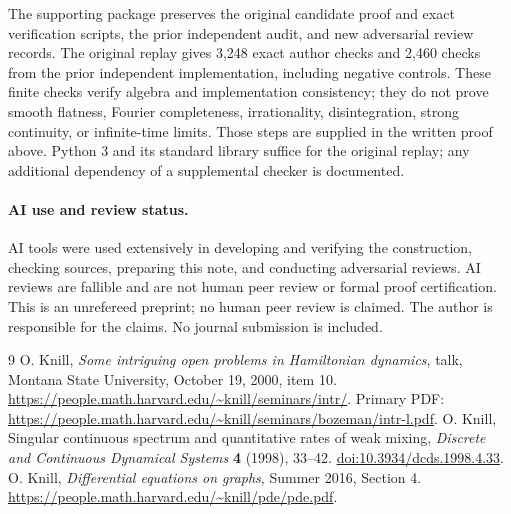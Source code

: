 \documentclass[11pt]{article}
\begin{document}
The supporting package preserves the original candidate proof and exact
verification scripts, the prior independent audit, and new adversarial review
records. The original replay gives 3,248 exact author checks and 2,460 checks
from the prior independent implementation, including negative controls.
These finite checks verify algebra and implementation consistency; they do
not prove smooth flatness, Fourier completeness, irrationality, disintegration,
strong continuity, or infinite-time limits. Those steps are supplied in the
written proof above. Python 3 and its standard library suffice for the original
replay; any additional dependency of a supplemental checker is documented.

\paragraph{AI use and review status.}
AI tools were used extensively in developing and verifying the construction,
checking sources, preparing this note, and conducting adversarial reviews.
AI reviews are fallible and are not human peer review or formal proof
certification. This is an unrefereed preprint; no human peer review is claimed.
The author is responsible for the claims. No journal submission is included.

\begin{thebibliography}{9}
 O. Knill,
\emph{Some intriguing open problems in Hamiltonian dynamics},
talk, Montana State University, October 19, 2000, item 10.
\url{https://people.math.harvard.edu/~knill/seminars/intr/}.
Primary PDF: \url{https://people.math.harvard.edu/~knill/seminars/bozeman/intr-l.pdf}.
 O. Knill,
Singular continuous spectrum and quantitative rates of weak mixing,
\emph{Discrete and Continuous Dynamical Systems} \textbf{4} (1998), 33--42.
\href{https://doi.org/10.3934/dcds.1998.4.33}{doi:10.3934/dcds.1998.4.33}.
 O. Knill, \emph{Differential equations on graphs},
Summer 2016, Section 4.
\url{https://people.math.harvard.edu/~knill/pde/pde.pdf}.
\end{thebibliography}
\end{document}
